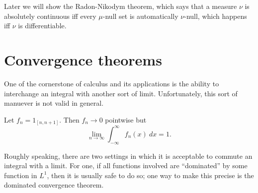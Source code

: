 \begin{subsec}
Later we will show the Radon-Nikodym theorem, which says that a measure $\nu$ is absolutely continuous iff every $\mu$-null set is automatically $\nu$-null, which happens iff $\nu$ is differentiable.
\end{subsec}


\section{Convergence theorems}
One of the cornerstone of calculus and its applications is the ability to interchange an integral with another sort of limit.
Unfortunately, this sort of manuever is not valid in general.

\begin{example}
Let $f_{n} = 1_{[n, n + 1]}$. Then $f_{n} \to 0$ pointwise but
\[\lim_{n \to \infty} \int_{-\infty}^{\infty} f_{n}(x) ~dx = 1.\]
\end{example}

\begin{subsec}
Roughly speaking, there are two settings in which it is acceptable to commute an integral with a limit.
For one, if all functions involved are ``dominated'' by some function in $L^1$, then it is usually safe to do so; one way to make this precise is the dominated convergence theorem.
\end{subsec}

